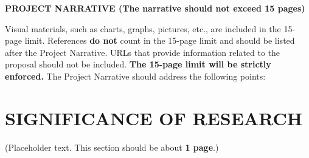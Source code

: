 \documentclass[11pt,letterpaper,english]{article}
\begin{document}
\setlength{\parindent}{0in} %

\pagestyle{fancy}   \renewcommand{%
\headrulewidth}{0.0pt}

\begin{center}
{\bf PROJECT NARRATIVE (The narrative should not exceed 15 pages)} 
\end{center}

\vspace{-.15in}



Visual materials, such as charts, graphs, pictures, etc., are included in the 15-page limit. References {\bf do not} count in the 15-page limit and should be listed after the Project Narrative. URLs that provide information related to the proposal should not be included. {\bf The 15-page limit will be strictly enforced.}  The Project Narrative should address the following points:

\vspace{-.25in}
\section{SIGNIFICANCE OF RESEARCH}
\vspace{-.2in}

(Placeholder text. This section should be about {\bf 1 page}.)
\end{document}
